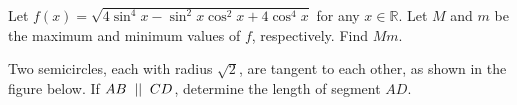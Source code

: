 \documentclass[12pt,paper=letter]{scrartcl}
\begin{document}
\begin{problem}  Let $f(x) = \sqrt{4\sin^4 x - \sin^2 x \cos^2 x + 4\cos^4 x }$ for any $x \in \mathbb{R}$. Let $M$ and $m$ be the maximum and minimum values of $f$, respectively. Find $Mm$.

\end{problem}



\begin{problem}  Two semicircles, each with radius $\sqrt{2}$, are tangent to each other, as shown in the figure below. If
$AB \hspace{2mm} || \hspace{2mm} CD$, determine the length of segment $AD$.

\begin{center}




\begin{tikzpicture}[x=0.75pt,y=0.75pt,yscale=-1,xscale=1]


\end{tikzpicture}
\end{center}
\end{problem}
\end{document}

